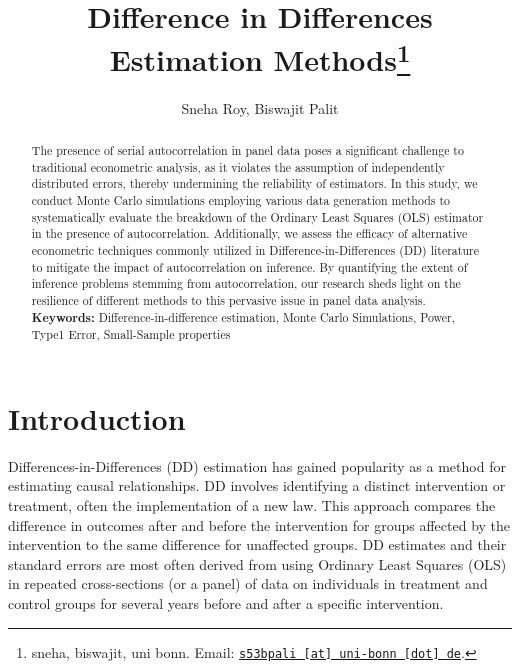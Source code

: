 \documentclass[11pt, a4paper, leqno]{article}
\begin{document}
\title{Difference in Differences Estimation Methods\thanks{sneha, biswajit, uni bonn. Email: \href{mailto:s53bpali@uni-bonn.de}{\nolinkurl{s53bpali [at] uni-bonn [dot] de}}.}}

\author{Sneha Roy, Biswajit Palit}


\maketitle


\begin{abstract}
    The presence of serial autocorrelation in panel data poses a significant challenge to traditional econometric analysis, 
    as it violates the assumption of independently distributed errors, thereby undermining the reliability of estimators. In this study, 
    we conduct Monte Carlo simulations employing various data generation methods to systematically evaluate the breakdown of the Ordinary Least Squares (OLS) estimator in the presence of autocorrelation. 
    Additionally, we assess the efficacy of alternative econometric techniques commonly utilized in Difference-in-Differences (DD) literature to mitigate the impact of autocorrelation on inference. By quantifying the extent of inference problems stemming from autocorrelation, 
    our research sheds light on the resilience of different methods to this pervasive issue in panel data analysis.\\[5pt]
    \textbf{Keywords: } Difference-in-difference estimation, Monte Carlo Simulations, Power, Type1 Error, Small-Sample properties
\end{abstract}

\clearpage

\section{Introduction} %
\label{sec:introduction}

Differences-in-Differences (DD) estimation has gained popularity as a method for estimating causal relationships. DD involves identifying a distinct intervention or treatment, often the implementation of a new law. 
This approach compares the difference in outcomes after and before the intervention for groups affected by the intervention to the same difference for unaffected groups. DD estimates and their standard errors are most often derived from using Ordinary Least Squares (OLS) 
in repeated cross-sections (or a panel) of data on individuals in treatment and control groups for several years before and after a specific intervention.
\end{document}
